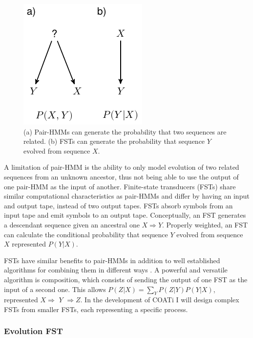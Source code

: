 \begin{figure}
\vspace{-2em}
\centering
\begin{framed}
    \includegraphics[scale=1]{figures/fig-fst.pdf}
    \caption{(a) Pair-HMMs can generate the probability that two sequences are
             related. (b) FSTs can generate the probability that sequence $Y$
             evolved from sequence $X$.}
    \label{fig:fst}
\end{framed}
\end{figure}

A limitation of pair-HMM is the ability to only model evolution of two related
sequences from an unknown ancestor, thus not being able to use the output of one
pair-HMM as the input of another.
Finite-state transducers (FSTs) share similar computational characteristics as
pair-HMMs and differ by having an input and output tape, instead of two output
tapes.
FSTs absorb symbols from an input tape and emit symbols to an output tape.
Conceptually, an FST generates a descendant sequence given an ancestral one
$X \Rightarrow Y$.
Properly weighted, an FST can calculate the conditional probability that
sequence $Y$ evolved from sequence $X$ represented $P(Y|X)$.

FSTs have similar benefits to pair-HMMs in addition to well established
algorithms for combining them in different ways
\parencite{bradley2007transducers}.
A powerful and versatile algorithm is composition, which consists of sending the
output of one FST as the input of a second one.
This allows $P(Z|X) = \sum_Y P(Z|Y) P(Y|X)$, represented $X \Rightarrow$
$Y$ $\Rightarrow Z$.
In the development of COATi I will design complex FSTs from smaller FSTs, each
representing a specific process.

\subsubsection{Evolution FST}

